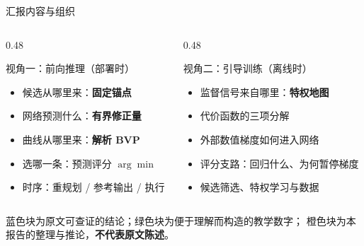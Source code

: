 
\begin{frame}{汇报内容与组织}
  \begin{columns}[t]
    \begin{column}{0.48\textwidth}
      \begin{block}{视角一：前向推理（部署时）}
        \small
        \begin{itemize}\tight
          \item 候选从哪里来：\textbf{固定锚点}
          \item 网络预测什么：\textbf{有界修正量}
          \item 曲线从哪里来：\textbf{解析 BVP}
          \item 选哪一条：预测评分 $\arg\min$
          \item 时序：重规划 / 参考输出 / 执行
        \end{itemize}
      \end{block}
    \end{column}
    \begin{column}{0.48\textwidth}
      \begin{block}{视角二：引导训练（离线时）}
        \small
        \begin{itemize}\tight
          \item 监督信号来自哪里：\textbf{特权地图}
          \item 代价函数的三项分解
          \item 外部数值梯度如何进入网络
          \item 评分支路：回归什么、为何暂停梯度
          \item 候选筛选、特权学习与数据
        \end{itemize}
      \end{block}
    \end{column}
  \end{columns}

  \vspace{0.3em}
  \begin{reading}
    \small
    蓝色块为原文可查证的结论；绿色块为便于理解而构造的教学数字；
    橙色块为本报告的整理与推论，\textbf{不代表原文陈述}。
  \end{reading}
\end{frame}

